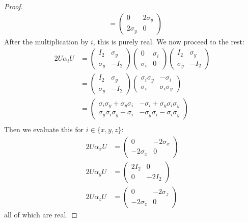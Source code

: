 \begin{proof}
\begin{align*}
			  &= \begin{pmatrix} 0 & 2\sigma_y \\ 2\sigma_y & 0 \end{pmatrix} 
	\end{align*}
	After the multiplication by $i$, this is purely real. We now proceed to the rest:
	\begin{align*}
		2U\alpha_i U &= \begin{pmatrix} I_2 & \sigma_y \\ \sigma_y & -I_2 \end{pmatrix} \begin{pmatrix} 0 & \sigma_i \\ \sigma_i & 0 \end{pmatrix} \begin{pmatrix} I_2 & \sigma_y \\ \sigma_y & -I_2 \end{pmatrix}  \\
			     &= \begin{pmatrix} I_2 & \sigma_y \\ \sigma_y & -I_2 \end{pmatrix} \begin{pmatrix} \sigma_i \sigma_y & -\sigma_i \\ \sigma_i & \sigma_i \sigma_y \end{pmatrix}  \\
			     &= \begin{pmatrix} \sigma_i \sigma_y + \sigma_y \sigma_i & -\sigma_i + \sigma_y\sigma_i\sigma_y \\ \sigma_y\sigma_i \sigma_y- \sigma_i & -\sigma_y \sigma_i - \sigma_i \sigma_y \end{pmatrix}  \\
	\end{align*}
	Then we evaluate this for $i\in \{x,y,z\} $:
	\begin{align*}
		2U\alpha_x U &= \begin{pmatrix} 0 & -2\sigma_x \\ -2\sigma_x & 0 \end{pmatrix} \\
		2U\alpha_y U &= \begin{pmatrix} 2I_2 & 0 \\ 0 & -2I_2 \end{pmatrix}\\
		2U\alpha_z U &= \begin{pmatrix} 0 & -2\sigma_z \\ -2\sigma_z & 0 \end{pmatrix} 
	\end{align*}
	all of which are real.\qedhere
\end{proof}
